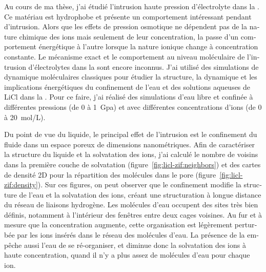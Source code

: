 \documentclass[thesis]{subfiles}
\begin{document}
\begin{otherlanguage}{french}
Au cours de ma thèse, j'ai étudié l'intrusion haute pression d'électrolyte dans
la . Ce matériau  est hydrophobe\cite{AOrtiz2014} et présente un
comportement intéressant pendant d'intrusion. Alors que les effets de pression
osmotique ne dépendent pas de la nature chimique des ions mais seulement de leur
concentration, la  passe d'un comportement énergétique à l'autre lorsque la
nature ionique change à concentration constante\cite{Ortiz2014}. Le mécanisme
exact et le comportement au niveau moléculaire de l'intrusion d'électrolytes
dans la  sont encore inconnus. J'ai utilisé des simulations de dynamique
moléculaires classiques pour étudier la structure, la dynamique et les
implications énergétiques du confinement de l'eau et des solutions aqueuses de
LiCl dans la . Pour ce faire, j'ai réalisé des simulations d'eau libre et
confinée à différentes pressions (de 0 à \SI{1}{Gpa}) et avec différentes
concentrations d'ions (de 0 à \SI{20}{mol/L}).

Du point de vue du liquide, le principal effet de l'intrusion est le confinement
du fluide dans un espace poreux de dimensions nanométriques. Afin de
caractériser la structure du liquide et la solvatation des ions, j'ai calculé le
nombre de voisins dans la première couche de solvatation
(figure~\ref{fig:licl-zif:neighbors}) et des cartes de densité 2D pour la
répartition des molécules dans le pore (figure~\ref{fig:licl-zif:density}). Sur
ces figures, on peut observer que le confinement modifie la structure de l'eau
et la solvatation des ions, créant une structuration à longue distance du réseau
de liaisons hydrogène. Les molécules d'eau occupent des sites très bien définis,
notamment à l'intérieur des fenêtres entre deux cages voisines. Au fur et à
mesure que la concentration augmente, cette organisation est légèrement
perturbée par les ions insérés dans le réseau des molécules d'eau. La présence
de la  empêche aussi l'eau de se ré-organiser, et diminue donc la
solvatation des ions à haute concentration, quand il n'y a plus assez de
molécules d'eau pour chaque ion.


\end{otherlanguage}
\end{document}
